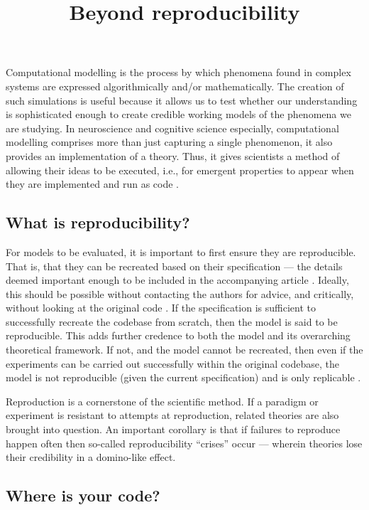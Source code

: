 \documentclass[jou]{apa6}
\title{Beyond reproducibility}
\begin{document}
\maketitle

Computational modelling is the process by which phenomena found in complex systems are expressed algorithmically and/or mathematically.
The creation of such simulations is useful because it allows us to test whether our understanding is sophisticated enough to create credible working models of the phenomena we are studying.
In neuroscience and cognitive science especially, computational modelling comprises more than just capturing a single phenomenon, it also provides an implementation of a theory.
Thus, it gives scientists a method of allowing their ideas to be executed, i.e., for emergent properties to appear when they are implemented and run as code \cite{mcclelland09}.

\subsection*{What is reproducibility?}

For models to be evaluated, it is important to first ensure they are reproducible. 
That is, that they can be recreated based on their specification --- the details deemed important enough to be included in the accompanying article \cite{hinsen15}.
Ideally, this should be possible without contacting the authors for advice, and critically, without looking at the original code \cite{cooper14,topalidou15}.
If the specification is sufficient to successfully recreate the codebase from scratch, then the model is said to be reproducible.
This adds further credence to both the model and its overarching theoretical framework.
If not, and the model cannot be recreated, then even if the experiments can be carried out successfully within the original codebase, the model is not reproducible (given the current specification) and is only replicable \cite{crook13}.

Reproduction is a cornerstone of the scientific method.
If a paradigm or experiment is resistant to attempts at reproduction, related theories are also brought into question.
An important corollary is that if failures to reproduce happen often then so-called reproducibility ``crises'' occur \cite{osc15} --- wherein theories lose their credibility in a domino-like effect.


\subsection*{Where is your code?}
\end{document}
